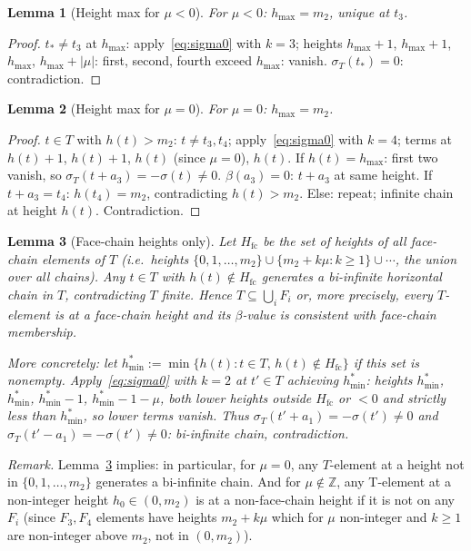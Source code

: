 \documentclass{article}
\newtheorem{lemma}{Lemma}
\begin{document}
\begin{lemma}[Height max for $\mu<0$]\label{lem:betamax4neg}
For $\mu<0$: $h_{\max}=m_2$, unique at $t_3$.
\end{lemma}
\begin{proof}
$t_*\ne t_3$ at $h_{\max}$: apply~\eqref{eq:sigma0} with $k=3$;
heights $h_{\max}+1$, $h_{\max}+1$, $h_{\max}$, $h_{\max}+|\mu|$: first, second, fourth exceed $h_{\max}$: vanish.
$\sigma_T(t_*)=0$: contradiction.
\end{proof}

\begin{lemma}[Height max for $\mu=0$]\label{lem:betamax4zero}
For $\mu=0$: $h_{\max}=m_2$.
\end{lemma}
\begin{proof}
$t\in T$ with $h(t)>m_2$: $t\ne t_3,t_4$; apply~\eqref{eq:sigma0} with $k=4$;
terms at $h(t)+1$, $h(t)+1$, $h(t)$ (since $\mu=0$), $h(t)$.
If $h(t)=h_{\max}$: first two vanish, so $\sigma_T(t+a_3)=-\sigma(t)\ne 0$.
$\beta(a_3)=0$: $t+a_3$ at same height.  If $t+a_3=t_4$: $h(t_4)=m_2$, contradicting $h(t)>m_2$.
Else: repeat; infinite chain at height $h(t)$.  Contradiction.
\end{proof}

\begin{lemma}[Face-chain heights only]\label{lem:facechain}
Let $H_{\mathrm{fc}}$ be the set of heights of all face-chain elements of $T$
\textup{(}i.e.\ heights $\{0,1,\dots,m_2\}\cup\{m_2+k\mu:k\ge 1\}\cup\cdots$, the union over all chains\textup{)}.
Any $t\in T$ with $h(t)\notin H_{\mathrm{fc}}$ generates a bi-infinite horizontal chain in $T$,
contradicting $T$ finite.  Hence $T\subseteq\bigcup_i F_i$ or, more precisely,
every $T$-element is at a face-chain height and its $\beta$-value is consistent with face-chain membership.

More concretely\textup{:} let $h_{\min}^*:=\min\{h(t):t\in T,\,h(t)\notin H_{\mathrm{fc}}\}$ if this set is nonempty.
Apply~\eqref{eq:sigma0} with $k=2$ at $t'\in T$ achieving $h_{\min}^*$\textup{:}
heights $h_{\min}^*$, $h_{\min}^*$, $h_{\min}^*-1$, $h_{\min}^*-1-\mu$,
both lower heights outside $H_{\mathrm{fc}}$ or $<0$ and strictly less than $h_{\min}^*$,
so lower terms vanish.  Thus $\sigma_T(t'+a_1)=-\sigma(t')\ne 0$ and $\sigma_T(t'-a_1)=-\sigma(t')\ne 0$\textup{:}
bi-infinite chain, contradiction.
\end{lemma}

\noindent\textit{Remark.} Lemma~\ref{lem:facechain} implies: in particular, for $\mu=0$, any $T$-element at a height not in $\{0,1,\dots,m_2\}$ generates a bi-infinite chain. And for $\mu\notin\mathbb Z$, any T-element at a non-integer height $h_0\in(0,m_2)$ is at a non-face-chain height if it is not on any $F_i$ (since $F_3,F_4$ elements have heights $m_2+k\mu$ which for $\mu$ non-integer and $k\ge 1$ are non-integer above $m_2$, not in $(0,m_2)$).
\end{document}
